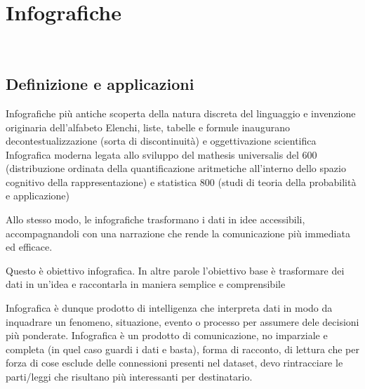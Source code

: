\chapter{Infografiche}
\label{cap:studio_infografiche}
\\



\section{Definizione e applicazioni}
Infografiche più antiche scoperta della natura discreta del linguaggio e invenzione originaria dell'alfabeto
Elenchi, liste, tabelle e formule inaugurano decontestualizzazione (sorta di discontinuità) e oggettivazione scientifica 
Infografica moderna legata allo sviluppo del mathesis universalis del 600 (distribuzione ordinata della quantificazione aritmetiche all'interno dello spazio cognitivo della rappresentazione) e statistica 800 (studi di teoria della probabilità e applicazione)

Allo stesso modo, le infografiche trasformano i dati in idee accessibili, accompagnandoli 
con una narrazione che rende la comunicazione più immediata ed efficace.


Questo è obiettivo infografica.  In altre parole l'obiettivo base è trasformare dei dati in un'idea e raccontarla in maniera semplice e comprensibile

Infografica è dunque prodotto di intelligenza che interpreta dati in modo da inquadrare un fenomeno, situazione, evento o processo per assumere dele decisioni più ponderate.
Infografica è un prodotto di comunicazione, no imparziale e completa (in quel caso guardi i dati e basta), forma di racconto, di lettura che per forza di cose esclude delle connessioni presenti nel dataset, devo rintracciare le parti/leggi che risultano più interessanti per destinatario.

